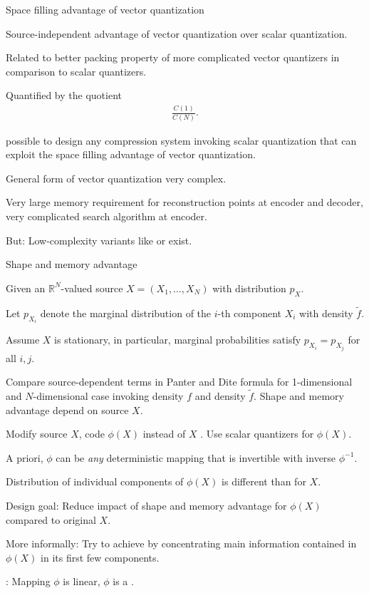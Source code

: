 \begin{frame}{Space filling advantage of vector quantization} 
\bit
\item Source-independent advantage of vector quantization over scalar quantization. 
\item Related to better packing property of more complicated vector quantizers in comparison to scalar quantizers. 
\item Quantified by the quotient 
\begin{align*}
\frac{C(1)}{C(N)}. 
\end{align*}
\item {} possible to design any compression system invoking scalar quantization that can exploit the space filling advantage of vector quantization. 
\item General form of vector quantization very complex. 
\item Very large memory requirement for reconstruction points at encoder and decoder, very complicated search algorithm at encoder. 
\item But: Low-complexity variants like  or  exist. 
\eit
\end{frame}


 

\begin{frame}{Shape and memory advantage}
\bit
\item Given an $\mathbb{R}^N$-valued source $X=(X_1,\dots,X_N)$ with distribution $p_X$. 
\item Let $p_{X_i}$ denote the marginal distribution of the $i$-th component $X_i$ with  density $\tilde{f}$.  
\item Assume $X$ is stationary, in particular, marginal probabilities satisfy $p_{X_i}=p_{X_j}$ for all $i, j$. 
\item {} Compare source-dependent terms in Panter and Dite formula for 1-dimensional and $N$-dimensional case invoking density $f$ and 
density $\tilde{f}$.
\eit 
\vspace{-0.1em}
Shape and memory advantage depend on source $X$. 
\bit
\item Modify source $X$, code $\phi(X)$ instead of $X$ . Use scalar quantizers for $\phi(X)$. 
\item A priori, $\phi$ can be \textit{any} deterministic mapping that is invertible with inverse $\phi^{-1}$. 
\item Distribution of  individual components of $\phi(X)$ is different than for $X$.
\item Design goal: Reduce impact of shape and memory advantage for $\phi(X)$ compared to original $X$.
\item More informally: Try to achieve  by concentrating main information contained in $\phi(X)$ in its first few components.
\item {}: Mapping $\phi$ is linear, $\phi$ is a .   
\eit
\end{frame}





